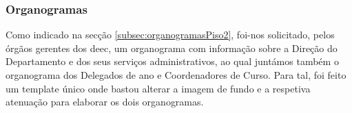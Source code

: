 
\subsubsection{Organogramas}

Como indicado na secção \ref{subsec:organogramasPiso2}, foi-nos solicitado, pelos órgãos gerentes dos \acrshort{deec}, um organograma com informação sobre a Direção do Departamento e dos seus serviços administrativos, ao qual juntámos também o organograma dos Delegados de ano e Coordenadores de Curso. Para tal, foi feito um template único onde bastou alterar a imagem de fundo e a respetiva atenuação para elaborar os dois organogramas.